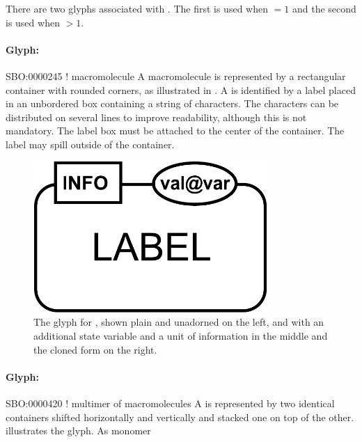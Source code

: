 There are two glyphs associated with . The
first  is used when  $= 1$
and the second  is used when
 $> 1$.

\paragraph{Glyph: }

\begin{glyphDescription}
\glyphSboTerm SBO:0000245 ! macromolecule
\glyphContainer A macromolecule is represented by a rectangular container with rounded
corners, as illustrated in .
\glyphLabel A  is identified by a label placed in an unbordered box containing a string of characters.  The characters can be distributed on several lines to improve readability, although this is not mandatory.  The label box must be attached to the center of the container.  The label may spill outside of the container.
\end{glyphDescription}

\begin{figure}[htb]
  \centering
  \includegraphics[width = 3.5in]{images/macromolecule}
  \caption{The \PD glyph for , shown plain and
    unadorned on the left, and with an additional state variable and a
    unit of information in the middle and the cloned form on the right.}
  \label{fig:techref:macromolecule}
\end{figure}

\paragraph{Glyph: }

\begin{glyphDescription}
\glyphSboTerm SBO:0000420 ! multimer of macromolecules
\glyphContainer A  is represented by two identical containers shifted horizontally and vertically and stacked one on top of the other.   illustrates the glyph.
\glyphLabel As monomer
\end{glyphDescription}

